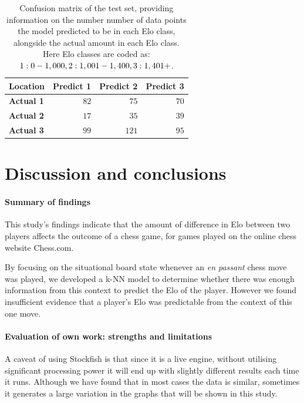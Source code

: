 \documentclass[10pt,a4paper]{article}
\begin{document}
\begin{multicols}{2}
\begin{table}[H]
  \centering
  \caption{Confusion matrix of the test set, providing information on the number number of data points the model predicted to be in each Elo class, alongside the actual amount in each Elo class. Here Elo classes are coded as: $1: 0 - 1,000, \newline 2: 1,001 - 1,400, \newline 3: 1,401+$.}
  \label{tab:confusion_matrix}
    \begin{tabular}{lrrr}
        \toprule
        \textbf{Location}&\textbf{Predict 1}&\textbf{Predict 2}&\textbf{Predict 3}\\
        \midrule
        \textbf{Actual 1}&$82$&$ 75$&$70$\tabularnewline
        \textbf{Actual 2}&$17$&$ 35$&$39$\tabularnewline
        \textbf{Actual 3}&$ 99$&$ 121$&$95$\tabularnewline
        \hline
    \end{tabular}
\end{table}




\section{Discussion and conclusions}



\paragraph{Summary of findings}
This study's findings indicate that the amount of difference in Elo between two players affects the outcome of a chess game, for games played on the online chess website Chess.com.  \newline

By focusing on the situational board state whenever an \textit{en passant} chess move was played, we developed a k-NN model to determine whether there was enough information from this context to predict the Elo of the player. However we
found insufficient evidence that a player's Elo was predictable from the context of this one move.




\paragraph{Evaluation of own work: strengths and limitations}
A caveat of using Stockfish is that since it is a live engine, without utilising significant processing power it will end up with slightly different results each time it runs. Although we have found that in most cases the data is similar, sometimes it generates a large variation in the graphs that will be shown in this study.\newline


\end{multicols}
\end{document}

